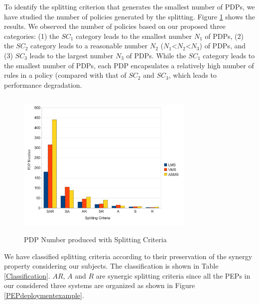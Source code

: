To identify the splitting criterion that generates the smallest number of PDPs, we have studied the number of policies generated by the
 splitting. Figure \ref{pdpnumber} shows the results.
We observed the number of policies based on our proposed three categories: (1) the $SC_{1}$ category leads to the smallest number $N_1$ of PDPs, 
(2) the $SC_{2}$ category leads to a reasonable number
 $N_2$ ($N_1$<$N_2$<$N_3$) of PDPs, and (3) $SC_{3}$ leads to the largest number $N_3$ of PDPs.
While the $SC_{1}$ category leads to the smallest number of PDPs, each PDP encapsulates a relatively high number of rules in a policy (compared
with that of $SC_{2}$ and $SC_{3}$, which leads to performance degradation. 
\begin{figure}[!h]
\centering
\includegraphics[width=8.5cm, height=7.2cm]{pdpnumber.pdf}
\begin{center}
\caption{PDP Number produced with Splitting Criteria}
\label{pdpnumber}
\end{center}
\end{figure}
We have classified splitting criteria according to their preservation of the synergy property considering our subjects. The classification is shown in Table \ref{Classification}. 
$AR$, $A$ and $R$ are synergic splitting criteria since all the PEPs in our considered three systems are organized as shown in Figure \ref{PEPdeploymentexample}. 
